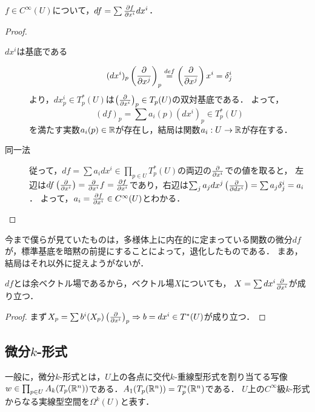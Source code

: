 \documentclass[uplatex,dvipdfmx]{jsreport}
\begin{document}
\begin{proposition}[関数の微分の成分表示]
    $f\in C^\infty(U)$について，$df=\sum\frac{\partial f}{\partial x^i}dx^i$．
\end{proposition}
\begin{proof}\mbox{}
    \begin{description}
        \item[$dx^i$は基底である] 
        \[(dx^i)_p\left(\frac{\partial }{\partial x^j}\right)_p\overset{def}{=}\left(\frac{\partial }{\partial x^j}\right)x^i=\delta^i_j\]
        より，$dx^i_p\in T^*_p(U)$は$\left(\frac{\partial }{\partial x^i}\right)_p\in T_p(U)$の双対基底である．
        よって，
        \[(df)_p=\sum a_i(p)(dx^i)_p\in T^*_p(U)\]
        を満たす実数$a_i(p)\in\mathbb{R}$が存在し，結局は関数$a_i:U\to\mathbb{R}$が存在する．
        \item[同一法]
        従って，$df=\sum a_idx^i\in\prod_{p\in U}T^*_p(U)$の両辺の$\frac{\partial }{\partial x^i}$での値を取ると，
        左辺は$df\left(\frac{\partial }{\partial x^i}\right)=\frac{\partial }{\partial x^i}f=\frac{\partial f}{\partial x^i}$であり，右辺は$\sum_{j}a_jdx^j\left(\frac{\partial }{\partial dx^i}\right)=\sum a_j\delta^i_j=a_i$．
        よって，$a_i=\frac{\partial f}{\partial x^i}\in C^\infty(U)$とわかる．
    \end{description}
\end{proof}
\begin{remarks}
    今まで僕らが見ていたものは，多様体上に内在的に定まっている関数の微分$df$が，標準基底を暗黙の前提にすることによって，退化したものである．
    まあ，結局はそれ以外に捉えようがないが．
\end{remarks}

\begin{proposition}[双対命題]
    $df$とは余ベクトル場であるから，ベクトル場$X$についても，
    $X=\sum dx^i\frac{\partial }{\partial x^i}$が成り立つ．
\end{proposition}
\begin{proof}
    まず$X_p=\sum b^i(X_p)\left(\frac{\partial }{\partial x^i}\right)_p\Rightarrow b=dx^i\in T^*(U)$が成り立つ．
\end{proof}

\subsection{微分$k$-形式}

\begin{definition}[$k$-form]
    一般に，微分$k$-形式とは，$U$上の各点に交代$k$-重線型形式を割り当てる写像$w\in\prod_{p\in U}A_k(T_p(\mathbb{R}^n))$である．$A_1(T_p(\mathbb{R}^n))=T^*_p(\mathbb{R}^n)$である．
    $U$上の$C^\infty$級$k$-形式からなる実線型空間を$\Omega^k(U)$と表す．
\end{definition}
\end{document}
